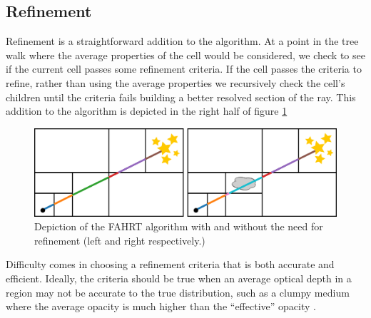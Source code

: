 \documentclass[fleqn,usenatbib]{mnras}
\newcommand{\acro}{FAHRT}
\begin{document}
\subsection{Refinement}
Refinement is a straightforward addition to the algorithm. At a point in the 
tree walk where the average properties of the cell would be considered, we 
check to see if the current cell passes some refinement criteria. If the cell 
passes the criteria to refine, rather than using the average properties we 
recursively check the cell's children until the criteria fails building a 
better resolved  section of the ray. This addition to the algorithm is depicted
 in the right half of figure \ref{fig:tree}
\begin{figure}
\includegraphics[width=1\linewidth]{Figures/algorithm.png}
\caption{Depiction of the \acro{} algorithm with and without the need for 
refinement (left and right respectively.)}
\label{fig:tree}
\end{figure}

Difficulty comes in choosing a refinement criteria that is both accurate and 
efficient. Ideally, the criteria should be true when an average optical depth 
in a region may not be accurate to the true distribution, such as a clumpy 
medium where the average opacity is much higher than the ``effective'' opacity
 \citep{hegmanKegel03,varosiDwek99}.
\end{document}
